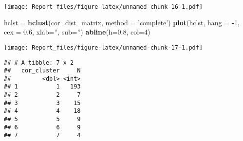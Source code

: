 \documentclass[]{article}
\newenvironment{Shaded}{\begin{snugshade}}{\end{snugshade}}
\newcommand{\KeywordTok}[1]{\textcolor[rgb]{0.13,0.29,0.53}{\textbf{#1}}}
\newcommand{\DataTypeTok}[1]{\textcolor[rgb]{0.13,0.29,0.53}{#1}}
\newcommand{\DecValTok}[1]{\textcolor[rgb]{0.00,0.00,0.81}{#1}}
\newcommand{\FloatTok}[1]{\textcolor[rgb]{0.00,0.00,0.81}{#1}}
\newcommand{\StringTok}[1]{\textcolor[rgb]{0.31,0.60,0.02}{#1}}
\newcommand{\OperatorTok}[1]{\textcolor[rgb]{0.81,0.36,0.00}{\textbf{#1}}}
\newcommand{\NormalTok}[1]{#1}
\begin{document}
\texttt{[image: Report\_files/figure-latex/unnamed-chunk-16-1.pdf]}

\begin{Shaded}
\begin{Highlighting}[]
\NormalTok{hclst =}\StringTok{ }\KeywordTok{hclust}\NormalTok{(cor_dist_matrix, }\DataTypeTok{method =} \StringTok{'complete'}\NormalTok{)}
\KeywordTok{plot}\NormalTok{(hclst, }\DataTypeTok{hang =} \OperatorTok{-}\DecValTok{1}\NormalTok{, }\DataTypeTok{cex =} \FloatTok{0.6}\NormalTok{, }\DataTypeTok{xlab=}\StringTok{''}\NormalTok{, }\DataTypeTok{sub=}\StringTok{''}\NormalTok{)}
\KeywordTok{abline}\NormalTok{(}\DataTypeTok{h=}\FloatTok{0.8}\NormalTok{, }\DataTypeTok{col=}\DecValTok{4}\NormalTok{)}
\end{Highlighting}
\end{Shaded}

\texttt{[image: Report\_files/figure-latex/unnamed-chunk-17-1.pdf]}

\begin{Shaded}
\end{Shaded}

\begin{verbatim}
## # A tibble: 7 x 2
##   cor_cluster     N
##         <dbl> <int>
## 1           1   193
## 2           2     7
## 3           3    15
## 4           4    18
## 5           5     9
## 6           6     9
## 7           7     4
\end{verbatim}

\begin{Shaded}
\end{Shaded}
\end{document}
